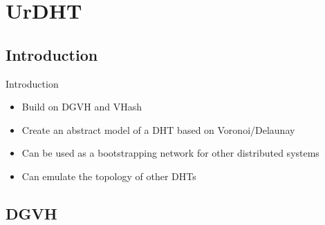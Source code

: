 \documentclass[11pt]{beamer}
\begin{document}






\section{UrDHT}

\subsection{Introduction}
\begin{frame}{Introduction}
	\begin{itemize}
		\item Build on DGVH and VHash
		\item Create an abstract model of a DHT based on Voronoi/Delaunay 
		\item Can be used as a bootstrapping network for other distributed systems
		\item Can emulate the topology of other DHTs
	\end{itemize}
\end{frame}





\subsection{DGVH}
\end{document}
